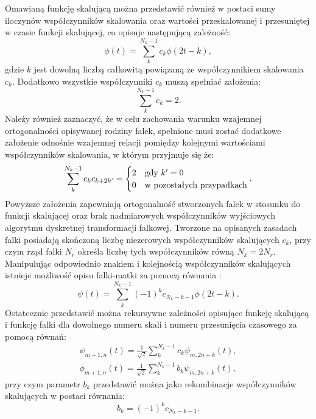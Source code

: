 Omawianą funkcję skalującą można przedstawić również w postaci sumy iloczynów współczynników skalowania oraz wartości przeskalowanej i przesuniętej w czasie funkcji skalującej, co opisuje następującą zależność:
\begin{equation}
\phi \left( t \right) = \sum _{k} ^{N_k-1} c_k \phi \left( 2t - k \right) \label{eqn_dwt_scalefunrek},
\end{equation}
gdzie $k$ jest dowolną liczbą całkowitą powiązaną ze współczynnikiem skalowania $c_k$. Dodatkowo wszystkie współczynniki $c_k$ muszą spełniać założenia:
\begin{equation}
\sum _{k} ^{N_k-1} c_k = 2 \label{eqn_dwt_scalefunsum}.
\end{equation}
Należy również zaznaczyć, że w celu zachowania warunku wzajemnej ortogonalności opisywanej rodziny falek, spełnione musi zostać dodatkowe założenie odnośnie wzajemnej relacji pomiędzy kolejnymi wartościami współczynników skalowania, w którym przyjmuje się że:
\begin{equation}
\sum _{k} ^{N_k-1} c_k c_{k+2k'} =
\begin{cases}
	2 & $gdy$ ~ k' = 0 \\
	0 & $w pozostałych przypadkach$
\end{cases}
\label{eqn_dwt_scalemulort}.
\end{equation}
Powyższe założenia zapewniają ortogonalność stworzonych falek w stosunku do funkcji skalującej oraz brak nadmiarowych współczynników wyjściowych algorytmu dyskretnej transformacji falkowej. Tworzone na opisanych zasadach falki posiadają skończoną liczbę niezerowych współczynników skalujących $c_k$, przy czym rząd falki $N_r$ określa liczbę tych współczynników równą $N_k = 2 N_r$. Manipulując odpowiednio znakiem i kolejnością współczynników skalujących istnieje możliwość opisu falki-matki za pomocą równania \cite{wallen_handbook}:
\begin{equation}
\psi \left( t \right) = \sum _{k} ^{N_k-1} \left( -1 \right) ^k c_{N_k-k-1} \phi \left( 2t - k \right) \label{eqn_dwt_waveletfunrek}.
\end{equation}
Ostatecznie przedstawić można rekursywne zależności opisujące funkcję skalującą i funkcję falki dla dowolnego numeru skali i numeru przesunięcia czasowego za pomocą równań:
\begin{gather}
\psi_{m+1,n} \left( t \right) = \frac{1}{\sqrt{2}} \sum _{k} ^{N_k-1} c_{k} \psi_{m,2n+k} \left( t \right) \label{eqn_dwt_fatherrek}, \\
\phi_{m+1,n} \left( t \right) = \frac{1}{\sqrt{2}} \sum _{k} ^{N_k-1} b_{k} \psi_{m,2n+k} \left( t \right) \label{eqn_dwt_matherrek},
\end{gather}
przy czym parametr $b_{k}$ przedstawić można jako rekombinacje współczynników skalujących w postaci równania:
\begin{equation}
b_{k} = \left( -1 \right) ^k c_{N_k-k-1} \label{eqn_dwt_bk}.
\end{equation}

